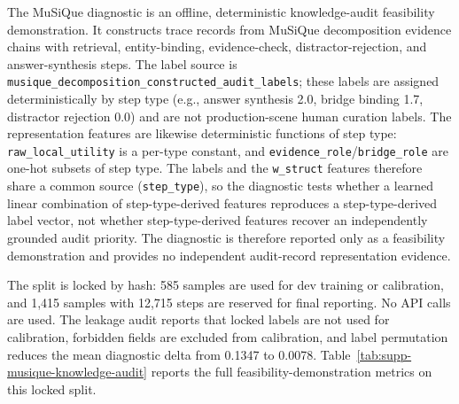 \documentclass[pdflatex,sn-mathphys-num]{sn-jnl}
\begin{document}
The MuSiQue diagnostic is an offline, deterministic knowledge-audit feasibility demonstration. It constructs trace records from MuSiQue decomposition evidence chains with retrieval, entity-binding, evidence-check, distractor-rejection, and answer-synthesis steps. The label source is \texttt{musique\_decomposition\_constructed\_audit\_labels}; these labels are assigned deterministically by step type (e.g., answer synthesis 2.0, bridge binding 1.7, distractor rejection 0.0) and are not production-scene human curation labels. The representation features are likewise deterministic functions of step type: \texttt{raw\_local\_utility} is a per-type constant, and \texttt{evidence\_role}/\texttt{bridge\_role} are one-hot subsets of step type. The labels and the \texttt{w\_struct} features therefore share a common source (\texttt{step\_type}), so the diagnostic tests whether a learned linear combination of step-type-derived features reproduces a step-type-derived label vector, not whether step-type-derived features recover an independently grounded audit priority. The diagnostic is therefore reported only as a feasibility demonstration and provides no independent audit-record representation evidence.

The split is locked by hash: 585 samples are used for dev training or calibration, and 1,415 samples with 12,715 steps are reserved for final reporting. No API calls are used. The leakage audit reports that locked labels are not used for calibration, forbidden fields are excluded from calibration, and label permutation reduces the mean diagnostic delta from 0.1347 to 0.0078. Table~\ref{tab:supp-musique-knowledge-audit} reports the full feasibility-demonstration metrics on this locked split.
\end{document}
